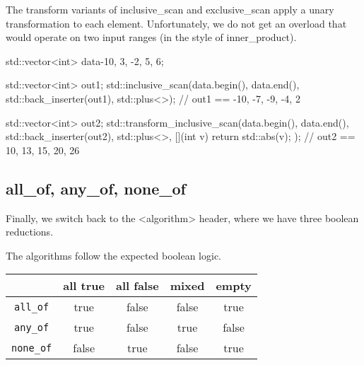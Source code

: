 

The transform variants of inclusive\_scan and exclusive\_scan apply a unary transformation to each element. Unfortunately, we do not get an overload that would operate on two input ranges (in the style of inner\_product).

\begin{box-note}
\begin{cppcode}
std::vector<int> data{-10, 3, -2, 5, 6};

std::vector<int> out1;
std::inclusive_scan(data.begin(), data.end(), std::back_inserter(out1), 
                    std::plus<>{});
// out1 == {-10, -7, -9, -4, 2}

std::vector<int> out2;
std::transform_inclusive_scan(data.begin(), data.end(), std::back_inserter(out2), 
                              std::plus<>{}, [](int v) { return std::abs(v); });
// out2 == {10, 13, 15, 20, 26}
\end{cppcode}
\end{box-note}

\subsection{all\_of, any\_of, none\_of}

Finally, we switch back to the <algorithm> header, where we have three boolean reductions.



The algorithms follow the expected boolean logic.

\begin{tabular}{c c c c c}
\hline
& all true & all false & mixed & empty \\
\hline
\texttt{all\_of} & true & false & false & true \\
\hline
\texttt{any\_of} & true & false & true & false \\
\hline
\texttt{none\_of} & false & true & false & true \\
\hline
\end{tabular}

